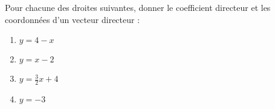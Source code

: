 
\begin{exercice}\label{exosmath-0608}

    Pour chacune des droites suivantes, donner le coefficient directeur et les coordonnées d'un vecteur directeur :
    \begin{multicols}{2}
        \begin{enumerate}
            \item
                \( y=4-x\)
            \item
                \( y=x-2\)
            \item
                \( y=\frac{ 3 }{ 2 }x+4\)
            \item
                \( y=-3\)
        \end{enumerate}
    \end{multicols}

\end{exercice}
